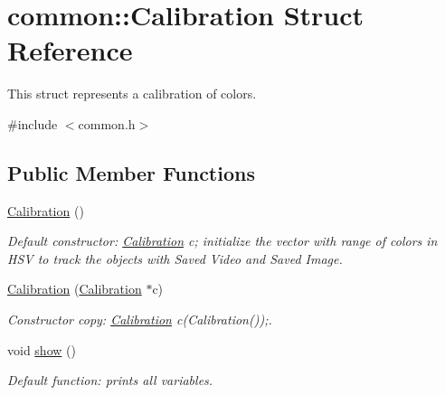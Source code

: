 \hypertarget{structcommon_1_1Calibration}{\section{common\-:\-:Calibration Struct Reference}
\label{structcommon_1_1Calibration}
}


This struct represents a calibration of colors.  




{\ttfamily \#include $<$common.\-h$>$}

\subsection*{Public Member Functions}
\begin{DoxyCompactItemize}
\item 
\hypertarget{structcommon_1_1Calibration_a5c5c85c1e1ff7b5f1e5272deb8bf04b2}{\hyperlink{structcommon_1_1Calibration_a5c5c85c1e1ff7b5f1e5272deb8bf04b2}{Calibration} ()}\label{structcommon_1_1Calibration_a5c5c85c1e1ff7b5f1e5272deb8bf04b2}

\begin{DoxyCompactList}\small\item\em Default constructor\-: \hyperlink{structcommon_1_1Calibration}{Calibration} c; initialize the vector with range of colors in H\-S\-V to track the objects with Saved Video and Saved Image. \end{DoxyCompactList}\item 
\hypertarget{structcommon_1_1Calibration_a4c79aae796dd932808e8e009643164d7}{\hyperlink{structcommon_1_1Calibration_a4c79aae796dd932808e8e009643164d7}{Calibration} (\hyperlink{structcommon_1_1Calibration}{Calibration} $\ast$c)}\label{structcommon_1_1Calibration_a4c79aae796dd932808e8e009643164d7}

\begin{DoxyCompactList}\small\item\em Constructor copy\-: \hyperlink{structcommon_1_1Calibration}{Calibration} c(\-Calibration());. \end{DoxyCompactList}\item 
\hypertarget{structcommon_1_1Calibration_aaec2830170bbb7dbce05c9e3139549a6}{void \hyperlink{structcommon_1_1Calibration_aaec2830170bbb7dbce05c9e3139549a6}{show} ()}\label{structcommon_1_1Calibration_aaec2830170bbb7dbce05c9e3139549a6}

\begin{DoxyCompactList}\small\item\em Default function\-: prints all variables. \end{DoxyCompactList}\end{DoxyCompactItemize}

